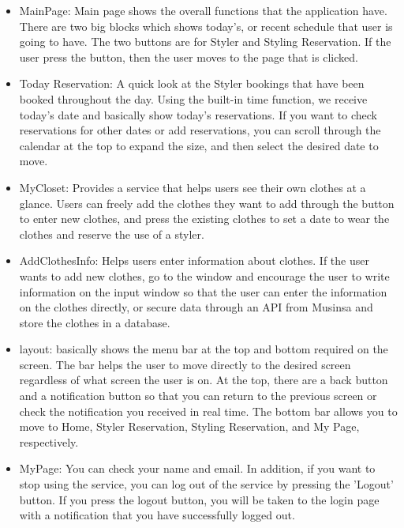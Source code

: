 \documentclass[conference]{IEEEtran}
\begin{document}
\begin{itemize}
    \item MainPage: Main page shows the overall functions that the application have. There are two big blocks which shows today's, or recent schedule that user is going to have. The two buttons are for Styler and Styling Reservation. If the user press the button, then the user moves to the page that is clicked.\\
    
    \item Today Reservation: A quick look at the Styler bookings that have been booked throughout the day. Using the built-in time function, we receive today's date and basically show today's reservations. If you want to check reservations for other dates or add reservations, you can scroll through the calendar at the top to expand the size, and then select the desired date to move.\\
    
    \item MyCloset: Provides a service that helps users see their own clothes at a glance. Users can freely add the clothes they want to add through the button to enter new clothes, and press the existing clothes to set a date to wear the clothes and reserve the use of a styler.
    
    \item AddClothesInfo: Helps users enter information about clothes. If the user wants to add new clothes, go to the window and encourage the user to write information on the input window so that the user can enter the information on the clothes directly, or secure data through an API from Musinsa and store the clothes in a database.
    
    \item layout: basically shows the menu bar at the top and bottom required on the screen. The bar helps the user to move directly to the desired screen regardless of what screen the user is on. At the top, there are a back button and a notification button so that you can return to the previous screen or check the notification you received in real time. The bottom bar allows you to move to Home, Styler Reservation, Styling Reservation, and My Page, respectively.
    
    \item MyPage: You can check your name and email. In addition, if you want to stop using the service, you can log out of the service by pressing the 'Logout' button. If you press the logout button, you will be taken to the login page with a notification that you have successfully logged out.\\
\end{itemize}
    
\end{document}
